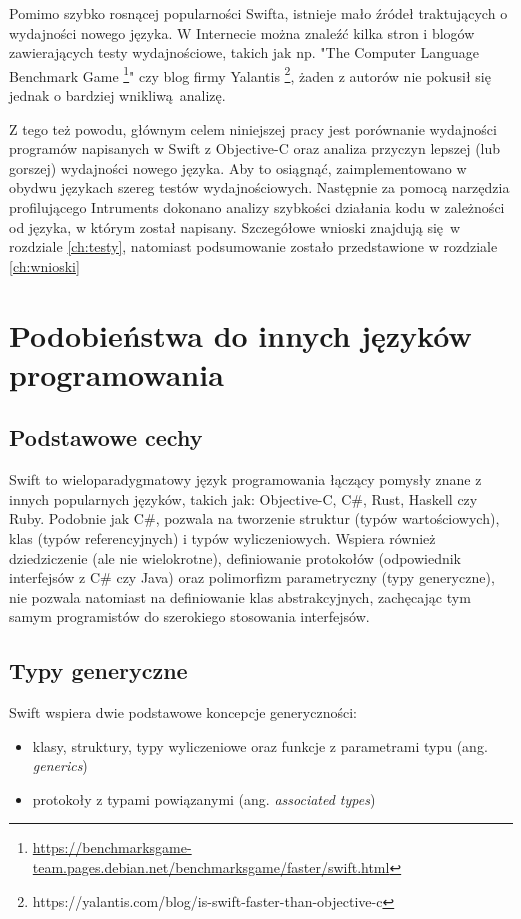\documentclass[mgr, shortabstract]{iithesis}
\begin{document}
Pomimo szybko rosnącej popularności Swifta, istnieje mało źródeł traktujących o wydajności nowego języka. W Internecie można znaleźć kilka stron i blogów zawierających testy wydajnościowe, takich jak np. "The Computer Language Benchmark Game \footnote{\url{https://benchmarksgame-team.pages.debian.net/benchmarksgame/faster/swift.html}}" czy blog firmy Yalantis \footnote{https://yalantis.com/blog/is-swift-faster-than-objective-c}, żaden z autorów nie pokusił się jednak o bardziej wnikliwą analizę. 

Z tego też powodu, głównym celem niniejszej pracy jest porównanie wydajności programów napisanych w Swift z Objective-C oraz analiza przyczyn lepszej (lub gorszej) wydajności nowego języka. Aby to osiągnąć, zaimplementowano w obydwu językach szereg testów wydajnościowych. Następnie za pomocą narzędzia profilującego Intruments dokonano analizy szybkości działania kodu w zależności od języka, w którym został napisany. Szczegółowe wnioski znajdują się w rozdziale \ref{ch:testy}, natomiast podsumowanie zostało przedstawione w rozdziale \ref{ch:wnioski}

\chapter{Podobieństwa do innych języków programowania}
\label{ch:podobienstwa_do_innych}

\section{Podstawowe cechy}
\label{s:podstawowe_cechy}

Swift to wieloparadygmatowy język programowania łączący pomysły znane z innych popularnych języków, takich jak: Objective-C, C\#, Rust, Haskell czy Ruby. Podobnie jak C\#, pozwala na tworzenie struktur (typów wartościowych), klas (typów referencyjnych) i typów wyliczeniowych. Wspiera również dziedziczenie (ale nie wielokrotne), definiowanie protokołów (odpowiednik interfejsów z C\# czy Java) oraz polimorfizm parametryczny (typy generyczne), nie pozwala natomiast na definiowanie klas abstrakcyjnych, zachęcając tym samym programistów do szerokiego stosowania interfejsów.

\section{Typy generyczne}
\label{s:typy_generyczne}

Swift wspiera dwie podstawowe koncepcje generyczności:
\begin{itemize}
  \item klasy, struktury, typy wyliczeniowe oraz funkcje z parametrami typu (ang. \textit{generics})
  \item protokoły z typami powiązanymi (ang. \textit{associated types})
\end{itemize}
\end{document}
